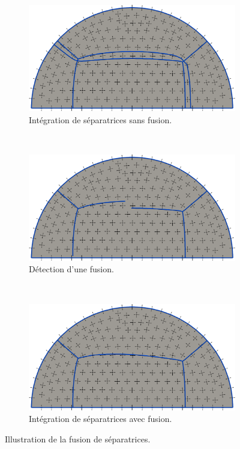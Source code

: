 \begin{figure}[!h]
\centering
\begin{subfigure}{0.65\textwidth}
    \includegraphics[width=\textwidth]{images/decoup_sans_fusion.pdf}
    \caption{Intégration de séparatrices sans fusion.}
    \label{fig:decoup_sans_fusion}
\end{subfigure}
\\[0.5cm]
\begin{subfigure}{0.65\textwidth}
    \includegraphics[width=\textwidth]{images/decoup_detect_fusion.pdf}
    \caption{Détection d'une fusion.}
    \label{fig:decoup_detect_fusion}
\end{subfigure}
\\[0.5cm]
\begin{subfigure}{0.65\textwidth}
    \includegraphics[width=\textwidth]{images/decoup_fusion.pdf}
    \caption{Intégration de séparatrices avec fusion.}
    \label{fig:decoup_fusion}
\end{subfigure}
\caption{Illustration de la fusion de séparatrices.}
\label{fig:fusion}
\end{figure}


